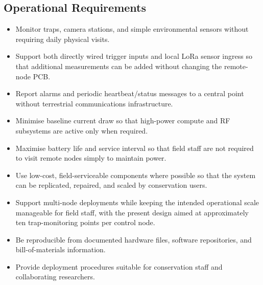 \documentclass[acmsmall,screen]{acmart}
\begin{document}
\subsection{Operational Requirements}
\begin{itemize}
    \item Monitor traps, camera stations, and simple environmental sensors without requiring daily physical visits.
    \item Support both directly wired trigger inputs and local LoRa sensor ingress so that additional measurements can be added without changing the remote-node PCB.
    \item Report alarms and periodic heartbeat/status messages to a central point without terrestrial communications infrastructure.
    \item Minimise baseline current draw so that high-power compute and RF subsystems are active only when required.
    \item Maximise battery life and service interval so that field staff are not required to visit remote nodes simply to maintain power.
    \item Use low-cost, field-serviceable components where possible so that the system can be replicated, repaired, and scaled by conservation users.
    \item Support multi-node deployments while keeping the intended operational scale manageable for field staff, with the present design aimed at approximately ten trap-monitoring points per control node.
    \item Be reproducible from documented hardware files, software repositories, and bill-of-materials information.
    \item Provide deployment procedures suitable for conservation staff and collaborating researchers.
\end{itemize}
\end{document}
